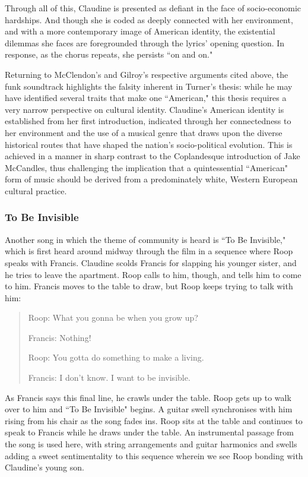 Through all of this, Claudine is presented as defiant in the face of socio-economic hardships.
And though she is coded as deeply connected with her environment, and with a more contemporary image of American identity, the existential dilemmas she faces are foregrounded through the lyrics' opening question.
In response, as the chorus repeats, she persists ``on and on."

Returning to McClendon's and Gilroy's respective arguments cited above, the funk soundtrack highlights the falsity inherent in Turner's thesis: while he may have identified several traits that make one ``American," this thesis requires a very narrow perspective on cultural identity.
Claudine's American identity is established from her first introduction, indicated through her connectedness to her environment and the use of a musical genre that draws upon the diverse historical routes that have shaped the nation's socio-political evolution.
This is achieved in a manner in sharp contrast to the Coplandesque introduction of Jake McCandles, thus challenging the implication that a quintessential ``American" form of music should be derived from a predominately white, Western European cultural practice.


\subsubsection{To Be Invisible}


Another song in which the theme of community is heard is ``To Be Invisible," which is first heard around midway through the film in a sequence where Roop speaks with Francis.
Claudine scolds Francis for slapping his younger sister, and he tries to leave the apartment.
Roop calls to him, though, and tells him to come to him.
Francis moves to the table to draw, but Roop keeps trying to talk with him:

\begin{quote}
    Roop: What you gonna be when you grow up?
    
    Francis: Nothing!
    
    Roop: You gotta do something to make a living.
    
    Francis: I don't know. I want to be invisible.
\end{quote}
As Francis says this final line, he crawls under the table.
Roop gets up to walk over to him and ``To Be Invisible" begins.
A guitar swell synchronises with him rising from his chair as the song fades ins.
Roop sits at the table and continues to speak to Francis while he draws under the table.
An instrumental passage from the song is used here, with  string arrangements and guitar harmonics and swells adding a sweet sentimentality to this sequence wherein we see Roop bonding with Claudine's young son.

